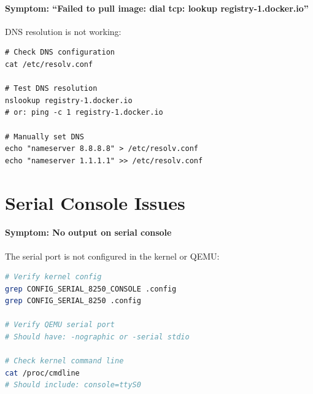 \paragraph{Symptom: ``Failed to pull image: dial tcp: lookup registry-1.docker.io''}

DNS resolution is not working:

\begin{lstlisting}
# Check DNS configuration
cat /etc/resolv.conf

# Test DNS resolution
nslookup registry-1.docker.io
# or: ping -c 1 registry-1.docker.io

# Manually set DNS
echo "nameserver 8.8.8.8" > /etc/resolv.conf
echo "nameserver 1.1.1.1" >> /etc/resolv.conf
\end{lstlisting}

\section{Serial Console Issues}

\paragraph{Symptom: No output on serial console}

The serial port is not configured in the kernel or QEMU:

\begin{lstlisting}[language=bash]
# Verify kernel config
grep CONFIG_SERIAL_8250_CONSOLE .config
grep CONFIG_SERIAL_8250 .config

# Verify QEMU serial port
# Should have: -nographic or -serial stdio

# Check kernel command line
cat /proc/cmdline
# Should include: console=ttyS0
\end{lstlisting}
